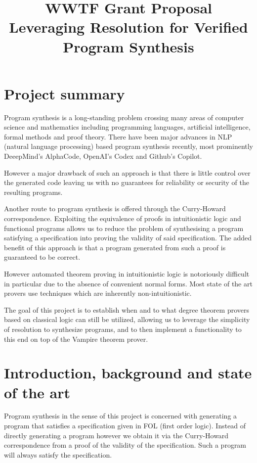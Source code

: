\documentclass[onehalfspacing]{article}
\title{WWTF Grant Proposal\\Leveraging Resolution for Verified Program Synthesis}
\begin{document}
	
	\maketitle
	
	\section{Project summary}
	
	Program synthesis is a long-standing problem crossing many areas of computer science and mathematics including programming languages, artificial intelligence, formal methods and proof theory. There have been major advances in NLP (natural language processing) based program synthesis recently, most prominently DeeepMind's AlphaCode, OpenAI's Codex and Github's Copilot.
	
	However a major drawback of such an approach is that there is little control over the generated code leaving us with no guarantees for reliability or security of the resulting programs.
	
	Another route to program synthesis is offered through the Curry-Howard correspondence. Exploiting the equivalence of proofs in intuitionistic logic and functional programs allows us to reduce the problem of synthesising a program satisfying a specification into proving the validity of said specification. The added benefit of this approach is that a program generated from such a proof is guaranteed to be correct.
	
	However automated theorem proving in intuitionistic logic is notoriously difficult in particular due to the absence of convenient normal forms. Most state of the art provers use techniques which are inherently non-intuitionistic.
	
	The goal of this project is to establish when and to what degree theorem provers based on classical logic can still be utilized, allowing us to leverage the simplicity of resolution to synthesize programs, and to then implement a functionality to this end on top of the Vampire theorem prover.
	
	
	\section{Introduction, background and state of the art}	
	
	Program synthesis in the sense of this project is concerned with generating a program that satisfies a specification given in FOL (first order logic). Instead of directly generating a program however we obtain it via the Curry-Howard correspondence from a proof of the validity of the specification. Such a program will always satisfy the specification.
	
\end{document}

